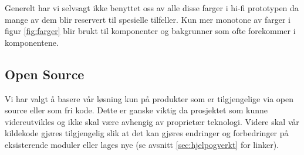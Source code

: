 Generelt har vi selvsagt ikke benyttet oss av alle disse farger i hi-fi prototypen da mange av dem blir reservert til spesielle tilfeller. Kun mer monotone av farger i figur \ref{fig:farger} blir brukt til komponenter og bakgrunner som ofte forekommer i komponentene.

\subsection{Open Source}
Vi har valgt å basere vår løsning kun på produkter som er tilgjengelige via open source eller som fri kode. Dette er ganske viktig da prosjektet som kunne videreutvikles og ikke skal være avhengig av proprietær teknologi. Videre skal vår kildekode gjøres tilgjengelig slik at det kan gjøres endringer og forbedringer på eksisterende moduler eller lages nye (se avsnitt \ref{sec:hjelpogverkt} for linker). 
